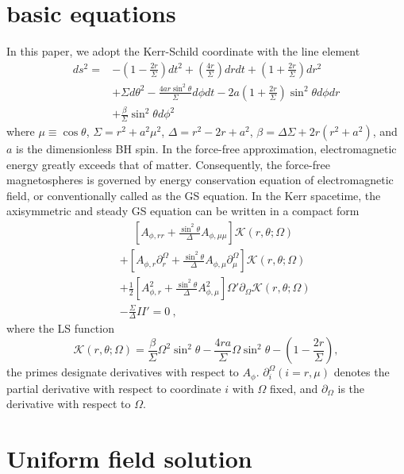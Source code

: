 \documentclass[aps,prd,reprint,nofootinbib, superscriptaddress]{revtex4-1}
\def\nn{\nonumber}
\def\ct{\cos\theta}
\def\sst{\sin^2\theta}
\def\Ar{A_{\phi,r}}
\def\Arr{A_{\phi,rr}}
\def\Am{A_{\phi,\mu}}
\def\Amm{A_{\phi,\mu\mu}}
\def\be{\begin{equation}}
\def\ee{\end{equation}}
\def\ben{\begin{eqnarray}}
\def\een{\end{eqnarray}}
\begin{document}
\section{basic equations}
\label{sec:basic}
In this paper, we adopt the Kerr-Schild
coordinate with the line element
\[
\begin{aligned}
ds^2 =
&-\left( 1-\frac{2r}{\Sigma} \right)dt^2 + \left( \frac{4
r}{\Sigma} \right) dr dt + \left(1+\frac{2r}{\Sigma} \right) dr^2 \\
&+ \Sigma d\theta^2 - \frac{4 a r \sin^2\theta}{\Sigma} d\phi dt
- 2 a \left(1+\frac{2r}{\Sigma}\right) \sin^2\theta d\phi dr     \\
& + \frac{\beta}{\Sigma} \sst d\phi^2
\end{aligned}
\]
where $\mu\equiv\ct$, $\Sigma = r^2 + a^2 \mu^2$, $\Delta = r^2 -2r + a^2$,
$\beta = \Delta\Sigma + 2r(r^2 + a^2)$, and $a$ is the dimensionless BH spin.
In the force-free approximation, electromagnetic energy greatly exceeds that of matter.
Consequently, the force-free magnetospheres is governed by energy
conservation equation of electromagnetic field, or
conventionally called as the GS equation.
In the Kerr spacetime,
the axisymmetric and steady GS equation can be written in a compact form \cite{Pan2017}
\ben
\label{eq:GSg}
&&\phantom{+}
 \left[\Arr + \frac{\sst}{\Delta}\Amm \right]  \mathcal K(r,\theta; \Omega )\nn \\
&&
+\left[\Ar \partial_r^\Omega  +  \frac{\sst}{\Delta}\Am \partial_\mu^\Omega\right] \mathcal K(r,\theta; \Omega ) \nn \\
&&
+ \frac{1}{2}\left[\Ar^2 + \frac{\sst}{\Delta}\Am^2\right]  \Omega' \partial_\Omega \mathcal K(r,\theta; \Omega )\nn \\
&&
- \frac{\Sigma}{\Delta}II' = 0 \ ,
\een
where the LS function
\be
\label{eq:ls}
\mathcal K(r,\theta; \Omega )= \frac{\beta}{\Sigma}\Omega^2 \sst
-\frac{4ra}{\Sigma}\Omega \sst
-\left(1-\frac{2r}{\Sigma}\right),
\ee
the primes designate  derivatives with respect to $A_\phi$.
$\partial_i^\Omega (i=r, \mu)$  denotes the partial derivative
with respect to coordinate $i$ with $\Omega$ fixed, and $\partial_\Omega$ is the derivative with
respect to $\Omega$.

\section{Uniform field solution}
\label{sec:uni_sol}
\end{document}

